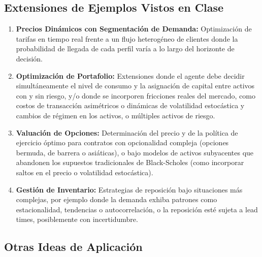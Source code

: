 \documentclass[11pt]{article}
\begin{document}
\subsection*{Extensiones de Ejemplos Vistos en Clase}
\begin{enumerate}
    \item \textbf{Precios Dinámicos con Segmentación de Demanda:}
    Optimización de tarifas en tiempo real frente a un flujo heterogéneo de clientes donde la probabilidad de llegada de cada perfil varía a lo largo del horizonte de decisión. 

    \item \textbf{Optimización de Portafolio:}
    Extensiones donde el agente debe decidir simultáneamente el nivel de consumo y la asignación de capital entre activos con y sin riesgo, y/o donde se incorporen fricciones reales del mercado, como costos de transacción asimétricos o dinámicas de volatilidad estocástica y cambios de régimen en los activos, o m\'ultiples activos de riesgo.

    \item \textbf{Valuación de Opciones:}
    Determinación del precio y de la política de ejercicio óptimo para contratos con opcionalidad compleja (opciones bermuda, de barrera o asiáticas), o bajo modelos de activos subyacentes que abandonen los supuestos tradicionales de Black-Scholes (como incorporar saltos en el precio o volatilidad estocástica).

    \item \textbf{Gestión de Inventario:}
    Estrategias de reposición bajo situaciones m\'as complejas, por ejemplo donde la demanda exhiba patrones como estacionalidad, tendencias o autocorrelación, o la reposici\'on est\'e sujeta a lead times, posiblemente con incertidumbre. 
\end{enumerate}

\subsection*{Otras Ideas de Aplicación}
\end{document}
